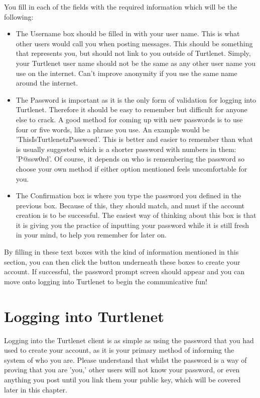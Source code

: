 You fill in each of the fields with the required information which will be the
following:
\begin{itemize}
\item The Username box should be filled in with your user name.  This is what
      other users would call you when posting messages.  This should be 
      something that represents you, but should not link to you outside of
      Turtlenet.  Simply, your Turtlenet user name should not be the same as
      any other user name you use on the internet.  Can't improve anonymity if
      you use the same name around the internet.
\item The Password is important as it is the only form of validation for logging
      into Turtlenet.  Therefore it should be easy to remember but difficult for
      anyone else to crack.  A good method for coming up with new passwords is
      to use four or five words, like a phrase you use.  An example would be
      'ThisIsTurtlenetzPassword'.  This is better and easier to remember than
      what is usually suggested which is a shorter password with numbers in
      them: 'P@ssw0rd'.  Of course, it depends on who is remembering the
      password so choose your own method if either option mentioned feels
      uncomfortable for you.
\item The Confirmation box is where you type the password you defined in the
      previous box.  Because of this, they should match, and must if the account
      creation is to be successful.  The easiest way of thinking about this box
      is that it is giving you the practice of inputting your password while it
      is still fresh in your mind, to help you remember for later on.
\end{itemize}

By filling in these text boxes with the kind of information mentioned in this
section, you can then click the button underneath these boxes to create your
account.  If successful, the password prompt screen should appear and you can
move onto logging into Turtlenet to begin the communicative fun!

\section{Logging into Turtlenet}
Logging into the Turtlenet client is as simple as using the password that you
had used to create your account, as it is your primary method of informing the
system of who you are.  Please understand that whilst the password is a way of
proving that you are 'you,' other users will not know your password, or even
anything you post until you link them your public key, which will be covered
later in this chapter.


